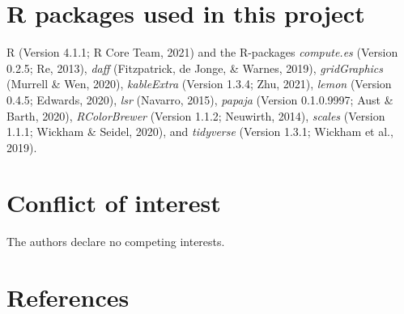 \documentclass[
  english,
  man, donotrepeattitle,floatsintext]{apa7}
\begin{document}
\hypertarget{r-packages-used-in-this-project}{%
\section{R packages used in this project}\label{r-packages-used-in-this-project}}

R (Version 4.1.1; R Core Team, 2021) and the R-packages \emph{compute.es} (Version 0.2.5; Re, 2013), \emph{daff} (Fitzpatrick, de Jonge, \& Warnes, 2019), \emph{gridGraphics} (Murrell \& Wen, 2020), \emph{kableExtra} (Version 1.3.4; Zhu, 2021), \emph{lemon} (Version 0.4.5; Edwards, 2020), \emph{lsr} (Navarro, 2015), \emph{papaja} (Version 0.1.0.9997; Aust \& Barth, 2020), \emph{RColorBrewer} (Version 1.1.2; Neuwirth, 2014), \emph{scales} (Version 1.1.1; Wickham \& Seidel, 2020), and \emph{tidyverse} (Version 1.3.1; Wickham et al., 2019).

\hypertarget{conflict-of-interest}{%
\section{Conflict of interest}\label{conflict-of-interest}}

The authors declare no competing interests.

\hypertarget{references}{%
\section{References}\label{references}}

\begingroup
\setlength{\parindent}{-0.5in}
\setlength{\leftskip}{0.5in}

\endgroup
\end{document}
